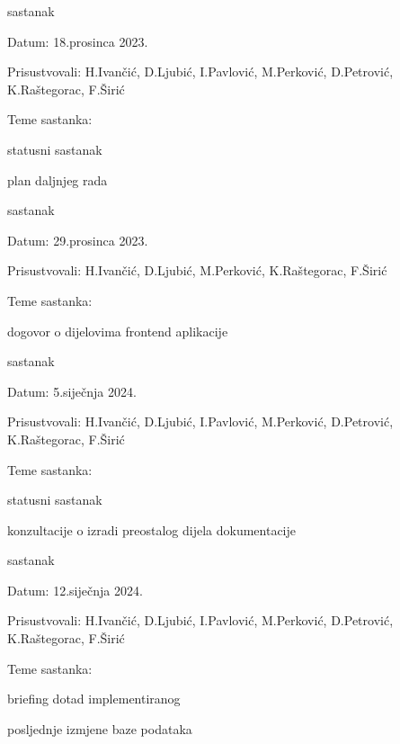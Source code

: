 \begin{packed_enum}
			\item  sastanak
						\item[] \begin{packed_item}
				\item Datum: 18.prosinca 2023.
				\item Prisustvovali: H.Ivančić, D.Ljubić, I.Pavlović, M.Perković, D.Petrović, K.Raštegorac, F.Širić
				\item Teme sastanka:
				\begin{packed_item}
					\item statusni sastanak
					\item plan daljnjeg rada
				\end{packed_item}
			\end{packed_item}
			
			\item  sastanak
			\begin{packed_item}
				\item Datum: 29.prosinca 2023.
				\item Prisustvovali: H.Ivančić, D.Ljubić, M.Perković, K.Raštegorac, F.Širić
				\item Teme sastanka:
				\begin{packed_item}
					\item dogovor o dijelovima frontend aplikacije
				\end{packed_item}
			\end{packed_item}
			
						\item  sastanak
						\begin{packed_item}
				\item Datum: 5.siječnja 2024.
				\item Prisustvovali: H.Ivančić, D.Ljubić, I.Pavlović, M.Perković, D.Petrović, K.Raštegorac, F.Širić
				\item Teme sastanka:
				\begin{packed_item}
					\item statusni sastanak
					\item konzultacije o izradi preostalog dijela dokumentacije
				\end{packed_item}
			\end{packed_item}
			
					\item sastanak				\begin{packed_item}
				\item Datum: 12.siječnja 2024.
				\item Prisustvovali: H.Ivančić, D.Ljubić, I.Pavlović, M.Perković, D.Petrović, K.Raštegorac, F.Širić
				\item Teme sastanka:
				\begin{packed_item}
					\item briefing dotad implementiranog
					\item posljednje izmjene baze podataka
				\end{packed_item}
			\end{packed_item}
			

\end{packed_enum}
